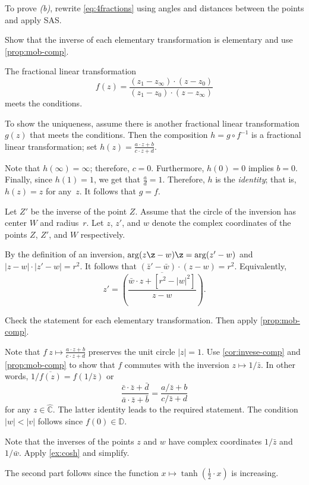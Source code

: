 To prove \textit{(b)}, rewrite \ref{eq:4fractions} using angles and distances between the points and apply SAS.

Show that the inverse of each elementary transformation is elementary
and use \ref{prop:mob-comp}.

The fractional linear transformation
\[f(z)=\frac{(z_1-z_\infty)\cdot(z-z_0)}{(z_1-z_0)\cdot(z-z_\infty)}\]
meets the conditions.

To show the uniqueness, assume there is another fractional linear transformation
$g(z)$ that meets the conditions.
Then the composition
$h=g\circ f^{-1}$ 
is a fractional linear transformation; set
$h(z)=\tfrac{a\cdot z+b}{c\cdot z+d}$.

Note that $h(\infty)=\infty$;
therefore, $c=0$.
Furthermore, $h(0)=0$ implies $b=0$.
Finally, since $h(1)=1$, we get that $\tfrac ad=1$.
Therefore, $h$ is the \emph{identity};
that is, $h(z)=z$ for any~$z$.
It follows that $g=f$.

Let $Z'$ be the inverse of the point $Z$.
Assume that the circle of the inversion has center $W$ and radius~$r$.
Let $z$, $z'$, and $w$ denote the complex coordinates of the points $Z$, $Z'$, and $W$ respectively.

By the definition of an inversion, $\arg (z\z-w)\z=\arg (z'-w)$ and
$|z-w|\cdot|z'-w|=r^2$.
It follows that $(\bar z'-\bar w)\cdot ( z- w)= r^2$.
Equivalently,
\[z'=\overline{\left(\frac{\bar w\cdot z+[r^2-|w|^2]}{z- w}\right)}.\]

 
Check the statement for each elementary transformation.
Then apply \ref{prop:mob-comp}.

Note that $f\:z\mapsto\tfrac{a\cdot z+b}{c\cdot z+d}$ preserves the unit circle $|z|=1$.
Use \ref{cor:invese-comp} and \ref{prop:mob-comp} to show that $f$ commutes with the inversion $z\mapsto 1/\bar z$.
In other words, $1/\overline{f(z)}=f(1/\bar z)$ or
\[\frac{\bar c\cdot \bar z+\bar d}{\bar a\cdot \bar z+\bar b}
=\frac{a/\bar z+b}{c/\bar z+d}\]
for any $z\in\hat{\mathbb{C}}$.
The latter identity leads to the required statement. 
The condition $|w|<|v|$ follows since $f(0)\in\mathbb{D}$.

Note that the inverses of the points $z$ and $w$ have complex coordinates $1/\bar z$ and $1/\bar w$.
Apply \ref{ex:cosh} and simplify.

The second part follows since the function $x\mapsto \tanh(\tfrac12\cdot x)$ is increasing.


